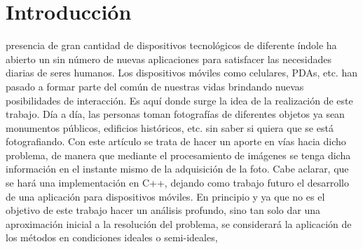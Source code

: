 \documentclass[conference,spanish,a4paper,10pt,oneside,final]{tfmpd}
\begin{document}
\section{Introducción}
 presencia de gran cantidad de dispositivos tecnológicos de diferente índole ha abierto un sin número de nuevas aplicaciones para satisfacer las necesidades diarias de seres humanos. Los dispositivos móviles como celulares, PDAs, etc. han pasado a formar parte del común de nuestras vidas brindando nuevas posibilidades de interacción. Es aquí donde surge la idea de la realización de este trabajo. 
Día a día, las personas toman fotografías de diferentes objetos ya sean monumentos públicos, edificios históricos, etc. sin saber si quiera que se está fotografiando. Con este artículo se trata de hacer un aporte en vías hacia dicho problema, de manera que mediante el procesamiento de imágenes se tenga dicha información en el instante mismo de la adquisición de la foto. Cabe aclarar, que se hará una implementación en C++, dejando como trabajo futuro el desarrollo de una aplicación para dispositivos móviles.
En principio y ya que no es el objetivo de este trabajo hacer un análisis profundo, sino tan solo dar una aproximación inicial a la resolución del problema, se considerará la aplicación de los métodos en condiciones ideales o semi-ideales, 
%
%
%
%
\end{document}
